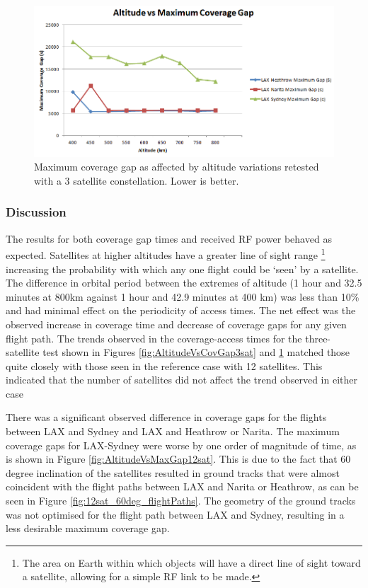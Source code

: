 \begin{figure}[htbp]
	\centering
	\includegraphics[scale = 0.6]{Pictures/AltitudeVsMaxGap3sat.png}
	
	\caption{Maximum coverage gap as affected by altitude variations retested with a 3 satellite constellation. Lower is better. }
	\label{fig:AltitudeVsMaxGap3sat}
\end{figure} 

\subsubsection{Discussion}
The results for both coverage gap times and received RF power behaved as expected. Satellites at higher altitudes have a greater line of sight range \footnote{The area on Earth within which objects will have a direct line of sight toward a satellite, allowing for a simple RF link to be made.} increasing the probability with which any one flight could be `seen' by a satellite. The difference in orbital period between the extremes of altitude (1 hour and 32.5 minutes at 800km against 1 hour and 42.9 minutes at 400 km) was less than 10\% and had minimal effect on the periodicity of access times. The net effect was the observed increase in coverage time and decrease of coverage gaps for any given flight path. The trends observed in the coverage-access times for the three-satellite test shown in Figures \ref{fig:AltitudeVsCovGap3sat} and \ref{fig:AltitudeVsMaxGap3sat} matched those quite closely with those seen in the reference case with 12 satellites. This indicated that the number of satellites did not affect the trend observed in either case

There was a significant observed difference in coverage gaps for the flights between LAX and Sydney and LAX and Heathrow or Narita. The maximum coverage gaps for LAX-Sydney were worse by one order of magnitude of time, as is shown in Figure \ref{fig:AltitudeVsMaxGap12sat}. This is due to the fact that 60 degree inclination of the satellites resulted in ground tracks that were almost coincident with the flight paths between LAX and Narita or Heathrow, as can be seen in Figure \ref{fig:12sat_60deg_flightPaths}. The geometry of the ground tracks was not optimised for the flight path between LAX and Sydney, resulting in a less desirable maximum coverage gap.


